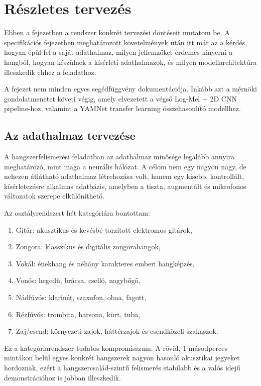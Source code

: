 \chapter{Részletes tervezés}
\label{chap:tervezes}

Ebben a fejezetben a rendszer konkrét tervezési döntéseit mutatom be. A specifikációs fejezetben meghatározott követelmények után itt már az a kérdés, hogyan épül fel a saját adathalmaz, milyen jellemzőket érdemes kinyerni a hangból, hogyan készülnek a kísérleti adathalmazok, és milyen modellarchitektúra illeszkedik ehhez a feladathoz.

A fejezet nem minden egyes segédfüggvény dokumentációja. Inkább azt a mérnöki gondolatmenetet követi végig, amely elvezetett a végső Log-Mel + 2D CNN pipeline-hoz, valamint a YAMNet transfer learning összehasonlító modellhez.

\section{Az adathalmaz tervezése}
\label{sec:dataset_design}

A hangszerfelismerési feladatban az adathalmaz minősége legalább annyira meghatározó, mint maga a neurális hálózat. A célom nem egy nagyon nagy, de nehezen átlátható adathalmaz létrehozása volt, hanem egy kisebb, kontrollált, kísérletezésre alkalmas adatbázis, amelyben a tiszta, augmentált és mikrofonos változatok szerepe elkülöníthető.

Az osztályrendszert hét kategóriára bontottam:
\begin{enumerate}
  \item[(1)] Gitár: akusztikus és kevésbé torzított elektromos gitárok,
  \item[(2)] Zongora: klasszikus és digitális zongorahangok,
  \item[(3)] Vokál: énekhang és néhány karakteres emberi hangképzés,
  \item[(4)] Vonós: hegedű, brácsa, cselló, nagybőgő,
  \item[(5)] Nádfúvós: klarinét, szaxofon, oboa, fagott,
  \item[(6)] Rézfúvós: trombita, harsona, kürt, tuba,
  \item[(7)] Zaj/csend: környezeti zajok, háttérzajok és csendközeli szakaszok.
\end{enumerate}

Ez a kategóriarendszer tudatos kompromisszum. A rövid, 1 másodperces mintákon belül egyes konkrét hangszerek nagyon hasonló akusztikai jegyeket hordoznak, ezért a hangszercsalád-szintű felismerés stabilabb és a valós idejű demonstrációhoz is jobban illeszkedik.

